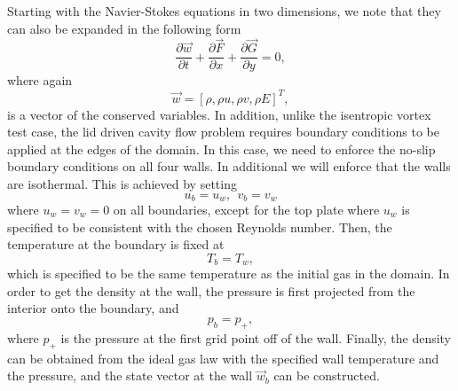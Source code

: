 Starting with the Navier-Stokes equations in two dimensions, we note that they can also be expanded in the following form
\begin{equation}
	\label{eqn:5js81pgl}
	\frac{\partial \vec{w}}{\partial t} + \frac{\partial{\vec{F}}}{\partial x} + \frac{\partial{\vec{G}}}{\partial y} = 0,
\end{equation}
where again
\begin{equation}
	\vec{w} = [\rho,\rho u, \rho v, \rho E]^T,
\end{equation}
is a vector of the conserved variables. In addition, unlike the isentropic vortex test case, the lid driven cavity flow problem requires boundary conditions to be applied at the edges of the domain. In this case, we need to enforce the no-slip boundary conditions on all four walls. In additional we will enforce that the walls are isothermal. This is achieved by setting
\begin{equation}
	u_b = u_w, \: \:
	v_b = v_w
\end{equation}
where $u_w = v_w = 0$ on all boundaries, except for the top plate where $u_w$ is specified to be consistent with the chosen Reynolds number. Then, the temperature at the boundary is fixed at
\begin{equation}
	T_b = T_w,
\end{equation}
which is specified to be the same temperature as the initial gas in the domain. In order to get the density at the wall, the pressure is first projected from the interior onto the boundary, and 
\begin{equation}
	p_b = p_+,
\end{equation}
where $p_+$ is the pressure at the first grid point off of the wall. Finally, the density can be obtained from the ideal gas law with the specified wall temperature and the pressure, and the state vector at the wall $\vec{w}_b$ can be constructed.

